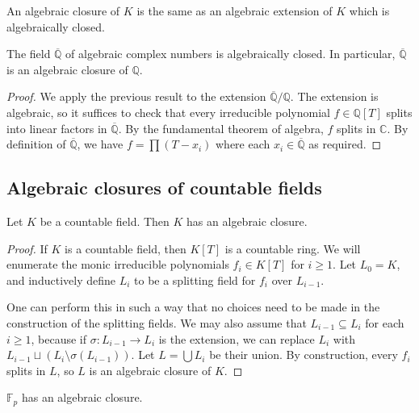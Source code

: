 \begin{remark}
	An algebraic closure of \( K \) is the same as an algebraic extension of \( K \) which is algebraically closed.
\end{remark}
\begin{corollary}
	The field \( \overline{\mathbb Q} \) of algebraic complex numbers is algebraically closed.
	In particular, \( \overline{\mathbb Q} \) is an algebraic closure of \( \mathbb Q \).
\end{corollary}
\begin{proof}
	We apply the previous result to the extension \( \overline{\mathbb Q} / \mathbb Q \).
	The extension is algebraic, so it suffices to check that every irreducible polynomial \( f \in \mathbb Q[T] \) splits into linear factors in \( \overline{\mathbb Q} \).
	By the fundamental theorem of algebra, \( f \) splits in \( \mathbb C \).
	By definition of \( \overline{\mathbb Q} \), we have \( f = \prod (T - x_i) \) where each \( x_i \in \overline{\mathbb Q} \) as required.
\end{proof}

\subsection{Algebraic closures of countable fields}
\begin{proposition}
	Let \( K \) be a countable field.
	Then \( K \) has an algebraic closure.
\end{proposition}
\begin{proof}
	If \( K \) is a countable field, then \( K[T] \) is a countable ring.
	We will enumerate the monic irreducible polynomials \( f_i \in K[T] \) for \( i \geq 1 \).
	Let \( L_0 = K \), and inductively define \( L_i \) to be a splitting field for \( f_i \) over \( L_{i-1} \).

	One can perform this in such a way that no choices need to be made in the construction of the splitting fields.
	We may also assume that \( L_{i-1} \subseteq L_i \) for each \( i \geq 1 \), because if \( \sigma \colon L_{i-1} \to L_i \) is the extension, we can replace \( L_i \) with \( L_{i-1} \sqcup (L_i \setminus \sigma(L_{i-1})) \).
	Let \( L = \bigcup L_i \) be their union.
	By construction, every \( f_i \) splits in \( L \), so \( L \) is an algebraic closure of \( K \).
\end{proof}
\begin{example}
	\( \mathbb F_p \) has an algebraic closure.
\end{example}

